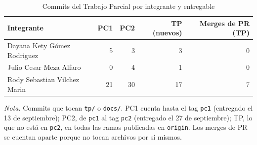 \begin{table}[H]
\caption{Commits del Trabajo Parcial por integrante y entregable}\label{tab:commits-autor}
\footnotesize
\begin{tabular}{@{}lrrrr@{}}
\toprule
\textbf{Integrante} & \textbf{PC1} & \textbf{PC2} & \textbf{TP (nuevos)} & \textbf{Merges de PR (TP)} \\
\midrule
Dayana Kety Gómez Rodriguez & 5 & 3 & 3 & 0 \\
Julio Cesar Meza Alfaro & 0 & 4 & 1 & 0 \\
Rody Sebastian Vilchez Marin & 21 & 30 & 17 & 7 \\
\bottomrule
\end{tabular}

{\footnotesize\textit{Nota.} Commits que tocan \texttt{tp/} o \texttt{docs/}. PC1 cuenta hasta el tag \texttt{pc1} (entregado el 13 de septiembre); PC2, de \texttt{pc1} al tag \texttt{pc2} (entregado el 27 de septiembre); TP, lo que no está en \texttt{pc2}, en todas las ramas publicadas en \texttt{origin}. Los merges de PR se cuentan aparte porque no tocan archivos por sí mismos.\par}
\end{table}

